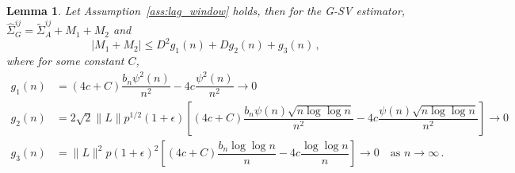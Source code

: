 \documentclass[11pt]{article}
\newtheorem{lemma}{Lemma}
\theoremstyle{remark}
\begin{document}
\begin{lemma} \label{lemma:G-SVE_breakdown}
Let Assumption~\ref{ass:lag_window} holds, then for the G-SV estimator, $\hat{\Sigma}_{G}^{ij} = \tilde{\Sigma}_A^{ij} + M_1 + M_2$ and 
\[
|M_1 + M_2| \leq D^2 g_1(n) + D g_2(n) + g_3(n)\,,
\]
where for some constant $C$,
\begin{align*}
    g_1(n) &= (4c+C)\dfrac{b_n \psi^2(n)}{n^2} - 4c\dfrac{\psi^2(n)}{n^2} \to 0\\
    g_2(n) &= 2\sqrt{2}\|L\|p^{1/2}(1+\epsilon)\left[(4c+C)\dfrac{b_n\psi(n)\sqrt{n\log \log n}}{n^2} - 4c\dfrac{\psi(n)\sqrt{n\log \log n}}{n^2}\right] \to 0\\
    g_3(n) &= \|L\|^2 p (1+\epsilon)^2\left[(4c+C)\dfrac{b_n \log\log n}{n} - 4c \dfrac{\log \log n}{n}\right] \to 0 \quad \text{as }n \to \infty\,.
\end{align*}
\end{lemma}
\end{document}
